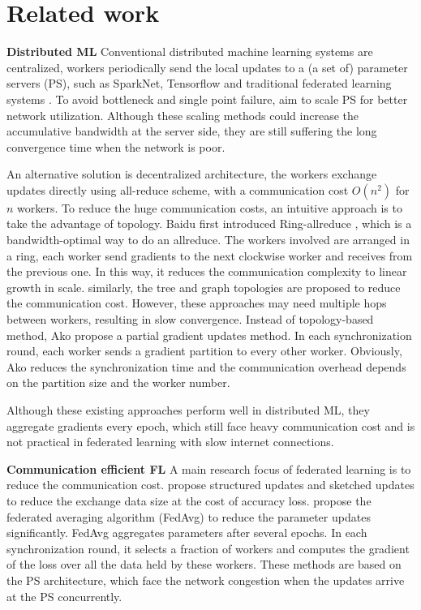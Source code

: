 \section{Related work}
\textbf{Distributed ML}
Conventional distributed machine learning systems are centralized, workers periodically send the local updates to a (a set of) parameter servers (PS), such as SparkNet\cite{moritz2016sparknet:}, Tensorflow\cite{abadi2016tensorflow:} and traditional federated learning systems \cite{konecny2015federated,konevcny2016federated}. To avoid bottleneck and single point failure, \cite{li2014scaling,mlsys2019towards} aim to scale PS for  better network utilization. Although these scaling methods could increase the accumulative bandwidth at the server side, they are still suffering the long convergence time when the network is poor.

An alternative solution is decentralized architecture, the workers exchange updates directly using all-reduce scheme, with a communication cost $O(n^2)$ for $n$ workers. To reduce the huge communication costs, an intuitive approach is to take the advantage of topology. Baidu first introduced Ring-allreduce \cite{allreduce}, which is a bandwidth-optimal way to do an allreduce. The workers involved are arranged in a ring, each worker send gradients to the next clockwise worker and receives from the previous one. In this way, it reduces the communication complexity to linear growth in scale. similarly, the tree \cite{li2015malt:} and graph \cite{agarwal2014a} topologies are proposed to reduce the communication cost. However, these approaches may need multiple hops between workers, resulting in slow convergence. Instead of topology-based method, Ako \cite{watcharapichat2016ako:} propose a partial gradient updates method. In each synchronization round, each worker sends a gradient partition to every other worker. Obviously, Ako reduces the synchronization time and the communication overhead depends on the partition size and the worker number. 
 
Although these existing approaches perform well in distributed ML, they aggregate gradients every epoch, which still face heavy communication cost and is not practical in federated learning with slow internet connections. 

 

\textbf{Communication efficient FL} 
A main research focus of federated learning is to reduce the communication cost. \cite{konevcny2016federated} propose structured updates and sketched updates to reduce the exchange data size at the cost of accuracy loss. \cite{McMahan2017FL} propose the federated averaging algorithm (FedAvg) to reduce the parameter updates significantly. FedAvg aggregates parameters after several epochs. In each synchronization round, it selects a fraction of workers and computes the gradient of the loss over all the data held by these workers. These methods are based on the PS architecture, which face the network congestion when the updates arrive at the PS concurrently.  

